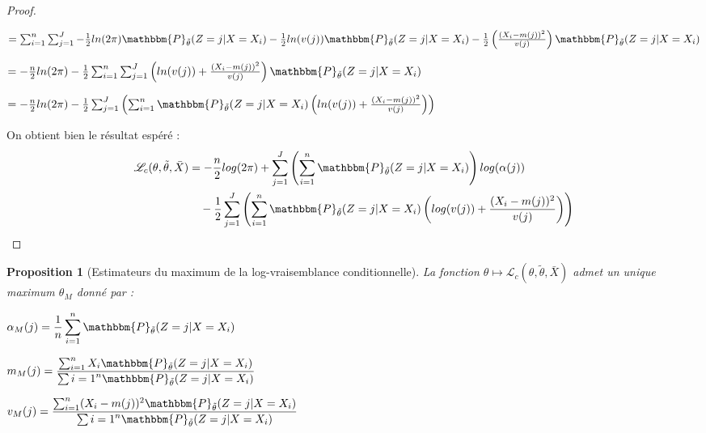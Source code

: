\documentclass[frenchb]{report}
\newcommand{\1}{\mathbbm{1}}
\newcommand{\prob}{\mathbbm{P}}
\newcommand{\lv}{\mathcal{L}}
\newcommand{\thetat}{\tilde{\theta}}
\newtheorem{prop}{Proposition}
\theoremstyle{definition}\newtheorem{defn}{Définition}
\theoremstyle{definition}\newtheorem{exm}{Exemple}
\theoremstyle{definition}\newtheorem{nota}{Notation}
\theoremstyle{definition}\newtheorem{rem}{Remarque}
\begin{document}
\begin{proof}
\begin{center}
\end{center}
\begin{center}
$=\sum_{i=1}^n \sum_{j = 1}^J -\frac{1}{2} ln(2\pi) \prob_{\thetat} (Z = j|X = X_i)-\frac{1}{2}ln(v(j)) \prob_{\thetat} (Z = j|X = X_i) -\frac{1}{2}\left(\frac{(X_i - m(j))^2}{v(j)}\right)\prob_{\thetat} (Z = j|X = X_i) $
\end{center}
\begin{center}
$=-\frac{n}{2}ln(2\pi)  -\frac{1}{2} \sum_{i=1}^n \sum_{j = 1}^J \left(ln(v(j)) + \frac{(X_i - m(j))^2}{v(j)}\right)\prob_{\thetat} (Z = j|X = X_i) $
\end{center}
\begin{center}
$=-\frac{n}{2}ln(2\pi)  -\frac{1}{2} \sum_{j=1}^J \left( \sum_{i = 1}^n \prob_{\thetat} (Z = j|X = X_i) \left(ln(v(j)) + \frac{(X_i - m(j))^2}{v(j)}\right)\right) $
\end{center}
On obtient bien le résultat espéré :
\begin{align*}
 \lv_{c}(\theta, \thetat, \bar{X}) &= -\frac{n}{2}log(2\pi)+\sum_{j=1}^J \left(\sum_{i = 1}^n  \prob_{\thetat}(Z=j|X=X_i)\right) log(\alpha(j))\\
&~~~-\frac{1}{2}\sum_{j=1}^J\left(\sum_{i=1}^n \prob_{\thetat}(Z=j|X=X_i)\left(log(v(j))+\frac{(X_i-m(j))^2}{v(j)}\right)\right)
\end{align*}
\end{proof}

\begin{prop}[Estimateurs du maximum de la log-vraisemblance conditionnelle] La fonction $\theta \mapsto \lv_{c}(\theta,\thetat,\bar{X})$ admet un unique maximum $\theta_M$ donné par : 
\begin{center}
$\alpha_M(j) = \displaystyle\frac{1}{n}\sum_{i=1}^n \prob_{\thetat}(Z=j|X=X_i)$
\end{center}
\begin{center}

$m_M(j) = \displaystyle\frac{\sum_{i=1}^n X_i\prob_{\thetat}(Z=j|X=X_i)}{\sum{i=1}^n \prob_{\thetat}(Z=j|X=X_i)}$
\end{center}
\begin{center}

$v_M(j) = \displaystyle\frac{\sum_{i=1}^n (X_i -m(j))^2 \prob_{\thetat}(Z=j|X=X_i)}{\sum{i=1}^n\prob_{\thetat}(Z=j|X=X_i)}$
\end{center}
\end{prop}
\end{document}
